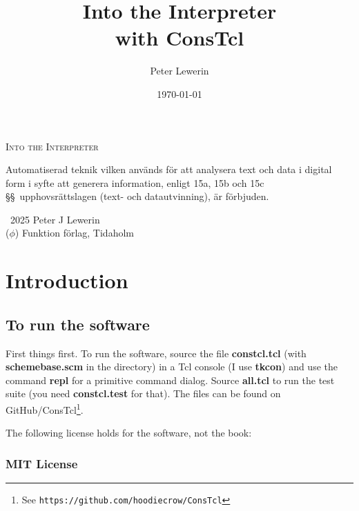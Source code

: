 \documentclass[a5paper,draft]{memoir}
\title{Into the Interpreter\\with ConsTcl}
\author{Peter Lewerin}
\date{\today}
\begin{document}
\frontmatter
\pagestyle{empty}
\begin{flushright}
{\scshape Into the Interpreter}
\end{flushright}
\cleardoublepage

\begin{center}
{\Huge\sffamily\thetitle}

\vspace{0.7in}
\theauthor

\end{center}
\clearpage

\begin{center}
{\small

Automatiserad teknik vilken används för att analysera text och data i digital
form i syfte att generera information, enligt 15a, 15b och 15c \S\S\ 
upphovsrättslagen (text- och datautvinning), är förbjuden.

\textcopyright\ 2025 Peter J Lewerin\\
($\phi$) Funktion förlag, Tidaholm
}
\end{center}
\clearpage

\pagestyle{plain}

\renewcommand*{\contentsname}{Short contents}
\setcounter{tocdepth}{0}%
\tableofcontents
\clearpage
\renewcommand*{\contentsname}{Contents}
\setcounter{tocdepth}{2}%
\tableofcontents

\chapter*{Introduction}
\label{introduction}
\section*{To run the software}
\label{to-run-the-software}


First things first. To run the software, source the file \textbf{constcl.tcl}
(with \textbf{schemebase.scm} in the directory) in a Tcl console (I use
\textbf{tkcon}) and use the command \textbf{repl} for a primitive command
dialog. Source \textbf{all.tcl} to run the test suite (you need
\textbf{constcl.test} for that). The files can be found on
GitHub/ConsTcl\footnote{See \texttt{https://github.com/hoodiecrow/ConsTcl}}.

The following license holds for the software, not the book:

\subsection{MIT License}
\label{mit-license}
\end{document}
